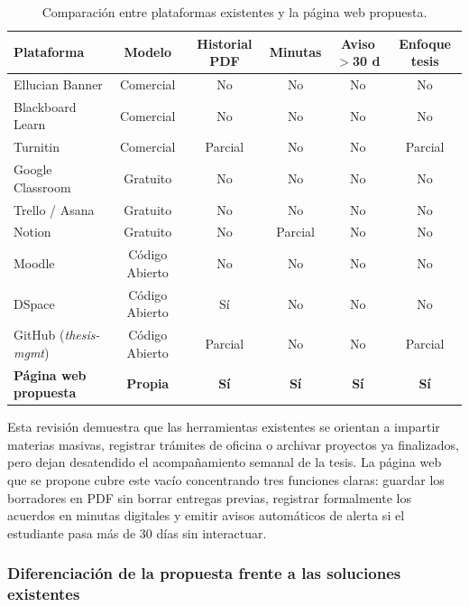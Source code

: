 \begin{table}[htbp]
\centering
\small
\singlespacing
\caption{Comparación entre plataformas existentes y la página web propuesta.}
\label{tab:benchmark}
\begin{tabular}{p{3.4cm} c c c c c}
\toprule
\textbf{Plataforma} & \textbf{Modelo} & \textbf{Historial PDF} & \textbf{Minutas} & \textbf{Aviso $>$30 d} & \textbf{Enfoque tesis} \\
\midrule
Ellucian Banner & Comercial & No & No & No & No \\
Blackboard Learn & Comercial & No & No & No & No \\
Turnitin & Comercial & Parcial & No & No & Parcial \\
Google Classroom & Gratuito & No & No & No & No \\
Trello / Asana & Gratuito & No & No & No & No \\
Notion & Gratuito & No & Parcial & No & No \\
Moodle & Código Abierto & No & No & No & No \\
DSpace & Código Abierto & Sí & No & No & No \\
GitHub (\textit{thesis-mgmt}) & Código Abierto & Parcial & No & No & Parcial \\
\textbf{Página web propuesta} & \textbf{Propia} & \textbf{Sí} & \textbf{Sí} & \textbf{Sí} & \textbf{Sí} \\
\bottomrule
\end{tabular}
\end{table}

Esta revisión demuestra que las herramientas existentes se orientan a impartir materias masivas, registrar trámites de oficina o archivar proyectos ya finalizados, pero dejan desatendido el acompañamiento semanal de la tesis. La página web que se propone cubre este vacío concentrando tres funciones claras: guardar los borradores en PDF sin borrar entregas previas, registrar formalmente los acuerdos en minutas digitales y emitir avisos automáticos de alerta si el estudiante pasa más de 30 días sin interactuar.

\subsubsection{Diferenciación de la propuesta frente a las soluciones existentes}
\label{subsubsec:diferenciacion_propuesta}

